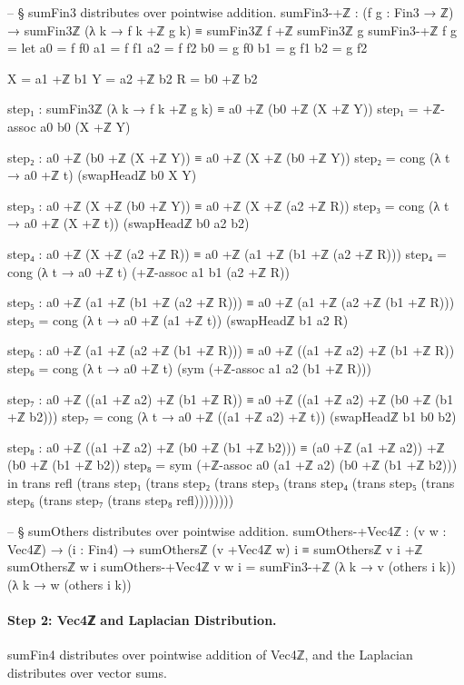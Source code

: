 \documentclass[11pt,a4paper]{book}
\def\texttt#1{#1}%
\begin{document}
\begin{code}
-- § sumFin3 distributes over pointwise addition.
sumFin3-+ℤ : (f g : Fin3 → ℤ) →
  sumFin3ℤ (λ k → f k +ℤ g k) ≡
  sumFin3ℤ f +ℤ sumFin3ℤ g
sumFin3-+ℤ f g =
  let
    a0 = f f0
    a1 = f f1
    a2 = f f2
    b0 = g f0
    b1 = g f1
    b2 = g f2

    X = a1 +ℤ b1
    Y = a2 +ℤ b2
    R = b0 +ℤ b2

    step₁ : sumFin3ℤ (λ k → f k +ℤ g k) ≡ a0 +ℤ (b0 +ℤ (X +ℤ Y))
    step₁ = +ℤ-assoc a0 b0 (X +ℤ Y)

    step₂ : a0 +ℤ (b0 +ℤ (X +ℤ Y)) ≡ a0 +ℤ (X +ℤ (b0 +ℤ Y))
    step₂ = cong (λ t → a0 +ℤ t) (swapHeadℤ b0 X Y)

    step₃ : a0 +ℤ (X +ℤ (b0 +ℤ Y)) ≡ a0 +ℤ (X +ℤ (a2 +ℤ R))
    step₃ = cong (λ t → a0 +ℤ (X +ℤ t)) (swapHeadℤ b0 a2 b2)

    step₄ : a0 +ℤ (X +ℤ (a2 +ℤ R)) ≡ a0 +ℤ (a1 +ℤ (b1 +ℤ (a2 +ℤ R)))
    step₄ = cong (λ t → a0 +ℤ t) (+ℤ-assoc a1 b1 (a2 +ℤ R))

    step₅ : a0 +ℤ (a1 +ℤ (b1 +ℤ (a2 +ℤ R))) ≡ a0 +ℤ (a1 +ℤ (a2 +ℤ (b1 +ℤ R)))
    step₅ = cong (λ t → a0 +ℤ (a1 +ℤ t)) (swapHeadℤ b1 a2 R)

    step₆ : a0 +ℤ (a1 +ℤ (a2 +ℤ (b1 +ℤ R))) ≡ a0 +ℤ ((a1 +ℤ a2) +ℤ (b1 +ℤ R))
    step₆ = cong (λ t → a0 +ℤ t) (sym (+ℤ-assoc a1 a2 (b1 +ℤ R)))

    step₇ : a0 +ℤ ((a1 +ℤ a2) +ℤ (b1 +ℤ R)) ≡ a0 +ℤ ((a1 +ℤ a2) +ℤ (b0 +ℤ (b1 +ℤ b2)))
    step₇ = cong (λ t → a0 +ℤ ((a1 +ℤ a2) +ℤ t)) (swapHeadℤ b1 b0 b2)

    step₈ : a0 +ℤ ((a1 +ℤ a2) +ℤ (b0 +ℤ (b1 +ℤ b2))) ≡ (a0 +ℤ (a1 +ℤ a2)) +ℤ (b0 +ℤ (b1 +ℤ b2))
    step₈ = sym (+ℤ-assoc a0 (a1 +ℤ a2) (b0 +ℤ (b1 +ℤ b2)))
  in
  trans
    refl
    (trans step₁
      (trans step₂
        (trans step₃
          (trans step₄
            (trans step₅
              (trans step₆
                (trans step₇
                  (trans step₈ refl))))))))

-- § sumOthers distributes over pointwise addition.
sumOthers-+Vec4ℤ : (v w : Vec4ℤ) → (i : Fin4) →
  sumOthersℤ (v +Vec4ℤ w) i ≡ sumOthersℤ v i +ℤ sumOthersℤ w i
sumOthers-+Vec4ℤ v w i =
  sumFin3-+ℤ (λ k → v (others i k)) (λ k → w (others i k))
\end{code}

\paragraph{Step 2: Vec4ℤ and Laplacian Distribution.}
\texttt{sumFin4} distributes over pointwise addition of \texttt{Vec4ℤ},
and the Laplacian distributes over vector sums.
\end{document}
